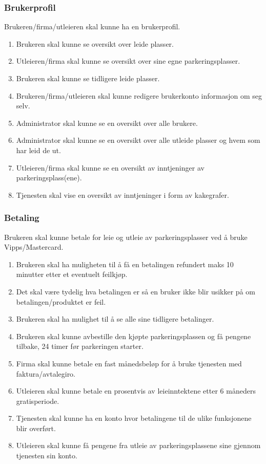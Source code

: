 \subsubsection{Brukerprofil}
\label{bruker_profil}
Brukeren/firma/utleieren skal kunne ha en brukerprofil.
\begin{enumerate}[label=(\alph*)]
    \item Brukeren skal kunne se oversikt over leide plasser.
    \item Utleieren/firma skal kunne se oversikt over sine egne parkeringsplasser.
    \item Brukeren skal kunne se tidligere leide plasser.
    \item Brukeren/firma/utleieren skal kunne redigere brukerkonto informasjon om seg selv.
    \item Administrator skal kunne se en oversikt over alle brukere.
    \item Administrator skal kunne se en oversikt over alle utleide plasser og hvem som har leid de ut.
    \item Utleieren/firma skal kunne se en oversikt av inntjeninger av parkeringsplass(ene). 
    \item Tjenesten skal vise en oversikt av inntjeninger i form av kakegrafer.
\end{enumerate}



\subsubsection{Betaling}
\label{betaling}
Brukeren skal kunne betale for leie og utleie av parkeringsplasser ved å bruke Vipps/Mastercard.
\begin{enumerate}[label=(\alph*)]
  \item Brukeren skal ha muligheten til   å få en betalingen refundert maks   10 minutter etter et eventuelt feilkjøp.
    \item Det skal være tydelig hva betalingen er så en bruker ikke blir usikker på om betalingen/produktet er feil. 
    \item Brukeren skal ha mulighet til å se alle sine tidligere betalinger.
    \item Brukeren skal kunne avbestille den kjøpte parkeringsplassen og få pengene tilbake, 24 timer før parkeringen starter.
    \item Firma skal kunne betale en fast månedsbeløp for å bruke tjenesten med faktura/avtalegiro.
    \item Utleieren skal kunne betale en prosentvis av leieinntektene etter 6 måneders gratisperiode.
    \item Tjenesten skal kunne ha en konto hvor betalingene til de ulike funksjonene blir overført. 
    \item Utleieren skal kunne få pengene fra utleie av parkeringsplassene sine gjennom tjenesten sin konto.
\end{enumerate}

